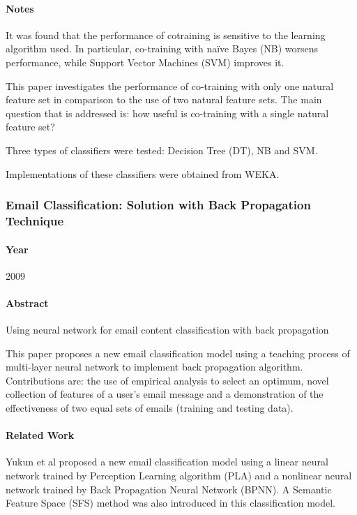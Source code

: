 \documentclass[12pt]{article}
\newenvironment{my_itemize}
{\begin{itemize}
  \setlength{\itemsep}{0cm}
  \setlength{\parskip}{0cm}}
{\end{itemize}}
\begin{document}
\paragraph{Notes}
\begin{my_itemize}
 \item It was found that the performance of cotraining is sensitive to the learning algorithm used. In particular, co-training with naïve Bayes (NB) worsens performance, while Support Vector Machines (SVM) improves it.
 \item This paper investigates the performance of co-training with only one natural feature set in comparison to the use of two natural feature sets. The main question that is addressed is: how useful is co-training with a single natural feature set?
 \item Three types of classifiers were tested: Decision Tree (DT), NB and SVM.
 \item Implementations of these classifiers were obtained from WEKA.
\end{my_itemize}


\subsubsection{Email Classification: Solution with Back Propagation Technique \cite{mous05}}
\paragraph{Year} 2009

\paragraph{Abstract}
\begin{my_itemize}
 \item Using neural network for email content classification with back propagation
 \item This paper proposes a new email classification model using a teaching process of multi-layer neural network to implement back propagation algorithm. Contributions are: the use of empirical analysis to select an optimum, novel collection of features of a user’s email message and a demonstration of the effectiveness of two equal sets of emails (training and testing data).
\end{my_itemize}

\paragraph{Related Work}
\begin{my_itemize}
 \item Yukun et al proposed a new email classification model using a linear neural network trained by Perception Learning algorithm (PLA) and a nonlinear neural network trained by Back Propagation Neural Network (BPNN). A Semantic Feature Space (SFS) method was also introduced in this classification model.
\end{my_itemize}
\end{document}
